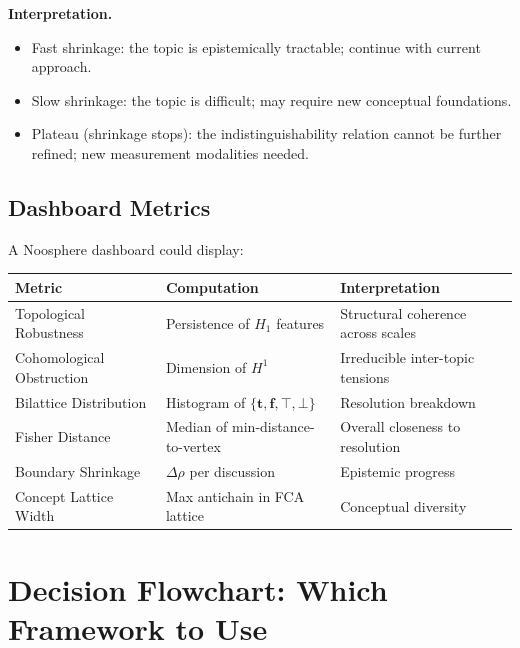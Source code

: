 \documentclass[11pt,letterpaper]{article}
\theoremstyle{definition}
\theoremstyle{remark}
\begin{document}
\textbf{Interpretation.}
\begin{itemize}
\item Fast shrinkage: the topic is epistemically tractable; continue with current approach.
\item Slow shrinkage: the topic is difficult; may require new conceptual foundations.
\item Plateau (shrinkage stops): the indistinguishability relation cannot be further refined; new measurement modalities needed.
\end{itemize}

\subsection{Dashboard Metrics}

A Noosphere dashboard could display:

\begin{center}
\begin{tabular}{|l|l|l|}
\hline
\textbf{Metric} & \textbf{Computation} & \textbf{Interpretation} \\
\hline
Topological Robustness & Persistence of $H_1$ features & Structural coherence across scales \\
Cohomological Obstruction & Dimension of $H^1$ & Irreducible inter-topic tensions \\
Bilattice Distribution & Histogram of $\{\mathbf{t}, \mathbf{f}, \top, \bot\}$ & Resolution breakdown \\
Fisher Distance & Median of min-distance-to-vertex & Overall closeness to resolution \\
Boundary Shrinkage & $\Delta \rho$ per discussion & Epistemic progress \\
Concept Lattice Width & Max antichain in FCA lattice & Conceptual diversity \\
\hline
\end{tabular}
\end{center}

\newpage

\section{Decision Flowchart: Which Framework to Use}
\label{sec:decision}
\end{document}
